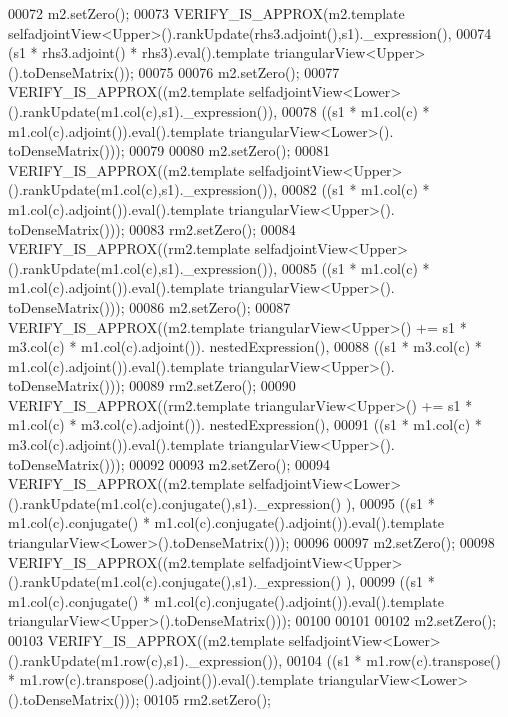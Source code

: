 \begin{DoxyCode}
00072   m2.setZero();
00073   VERIFY\_IS\_APPROX(m2.template selfadjointView<Upper>().rankUpdate(rhs3.adjoint(),s1).\_expression(),
00074                    (s1 * rhs3.adjoint() * rhs3).eval().template triangularView<Upper>().toDenseMatrix());
00075                    
00076   m2.setZero();
00077   VERIFY\_IS\_APPROX((m2.template selfadjointView<Lower>().rankUpdate(m1.col(c),s1).\_expression()),
00078                    ((s1 * m1.col(c) * m1.col(c).adjoint()).eval().template triangularView<Lower>().
      toDenseMatrix()));
00079                    
00080   m2.setZero();
00081   VERIFY\_IS\_APPROX((m2.template selfadjointView<Upper>().rankUpdate(m1.col(c),s1).\_expression()),
00082                    ((s1 * m1.col(c) * m1.col(c).adjoint()).eval().template triangularView<Upper>().
      toDenseMatrix()));
00083   rm2.setZero();
00084   VERIFY\_IS\_APPROX((rm2.template selfadjointView<Upper>().rankUpdate(m1.col(c),s1).\_expression()),
00085                    ((s1 * m1.col(c) * m1.col(c).adjoint()).eval().template triangularView<Upper>().
      toDenseMatrix()));
00086   m2.setZero();
00087   VERIFY\_IS\_APPROX((m2.template triangularView<Upper>() += s1 * m3.col(c) * m1.col(c).adjoint()).
      nestedExpression(),
00088                    ((s1 * m3.col(c) * m1.col(c).adjoint()).eval().template triangularView<Upper>().
      toDenseMatrix()));
00089   rm2.setZero();
00090   VERIFY\_IS\_APPROX((rm2.template triangularView<Upper>() += s1 * m1.col(c) * m3.col(c).adjoint()).
      nestedExpression(),
00091                    ((s1 * m1.col(c) * m3.col(c).adjoint()).eval().template triangularView<Upper>().
      toDenseMatrix()));
00092   
00093   m2.setZero();
00094   VERIFY\_IS\_APPROX((m2.template selfadjointView<Lower>().rankUpdate(m1.col(c).conjugate(),s1).\_expression()
      ),
00095                    ((s1 * m1.col(c).conjugate() * m1.col(c).conjugate().adjoint()).eval().template 
      triangularView<Lower>().toDenseMatrix()));
00096                    
00097   m2.setZero();
00098   VERIFY\_IS\_APPROX((m2.template selfadjointView<Upper>().rankUpdate(m1.col(c).conjugate(),s1).\_expression()
      ),
00099                    ((s1 * m1.col(c).conjugate() * m1.col(c).conjugate().adjoint()).eval().template 
      triangularView<Upper>().toDenseMatrix()));
00100   
00101   
00102   m2.setZero();
00103   VERIFY\_IS\_APPROX((m2.template selfadjointView<Lower>().rankUpdate(m1.row(c),s1).\_expression()),
00104                    ((s1 * m1.row(c).transpose() * m1.row(c).transpose().adjoint()).eval().template 
      triangularView<Lower>().toDenseMatrix()));
00105   rm2.setZero();

\end{DoxyCode}

